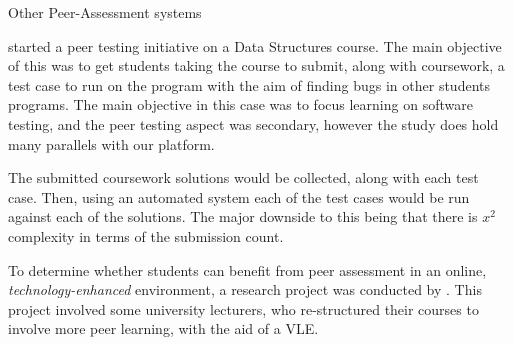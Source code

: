 \documentclass[sigplan,10pt,review]{acmart}\settopmatter{printfolios=true}
\begin{document}
Other Peer-Assessment systems
\cite{Aropa} \cite{WebPA}


\citet{goldwasser_gimmick_2002} started a peer testing initiative on a
Data Structures course.  The main objective of this was to get
students taking the course to submit, along with coursework, a test
case to run on the program with the aim of finding bugs in other
students programs. The main objective in this case was to focus
learning on software testing, and the peer testing aspect was
secondary, however the study does hold many parallels with our
platform.

The submitted coursework solutions would be collected, along with each
test case. Then, using an automated system each of the test cases
would be run against each of the solutions. The major downside to this
being that there is $x^2$ complexity in terms of the submission count.






To determine whether students can benefit from peer assessment in an
online, \textit{technology-enhanced} environment, a research project
was conducted by \citet{keppell_peer_2006}. This project
involved some university lecturers, who re-structured their courses to
involve more peer learning, with the aid of a \ac{VLE}.
\end{document}
